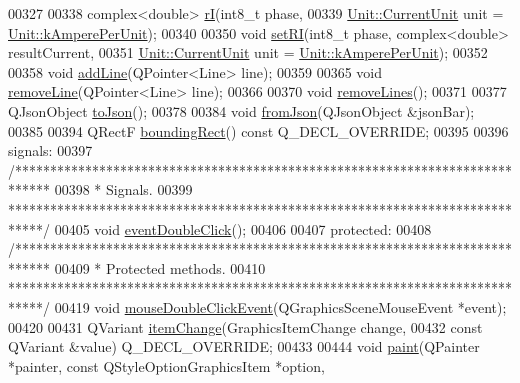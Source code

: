 \begin{DoxyCode}
00327 
00338   complex<double> \hyperlink{group___models_ga50eb46f3510205a9d6cb5e6547fa86df}{rI}(int8\_t phase,
00339                      \hyperlink{class_unit_a0794cf6c9682f48296dd4a5315389787}{Unit::CurrentUnit} unit = 
      \hyperlink{class_unit_a0794cf6c9682f48296dd4a5315389787aeed3b50e464d581cb630181a3b6a0709}{Unit::kAmperePerUnit});
00340 
00350   \textcolor{keywordtype}{void} \hyperlink{group___models_gaf7a406f8952b1e874c95c41b0955d250}{setRI}(int8\_t phase, complex<double> resultCurrent,
00351              \hyperlink{class_unit_a0794cf6c9682f48296dd4a5315389787}{Unit::CurrentUnit} unit = \hyperlink{class_unit_a0794cf6c9682f48296dd4a5315389787aeed3b50e464d581cb630181a3b6a0709}{Unit::kAmperePerUnit});
00352 
00358   \textcolor{keywordtype}{void} \hyperlink{group___models_gabb1a3b7653d4e2327c4bf728210f197e}{addLine}(QPointer<Line> line);
00359 
00365   \textcolor{keywordtype}{void} \hyperlink{group___models_gaec9faaf687415c27cd1d0527e1b94504}{removeLine}(QPointer<Line> line);
00366 
00370   \textcolor{keywordtype}{void} \hyperlink{group___models_ga4ea1a2074cb45968d80d6add571884a4}{removeLines}();
00371 
00377   QJsonObject \hyperlink{group___models_ga3eb84c42b687db6cd98e11b8bd38c86e}{toJson}();
00378 
00384   \textcolor{keywordtype}{void} \hyperlink{group___models_ga1df62f03dd3a066ceaf6588ba6bb6004}{fromJson}(QJsonObject &jsonBar);
00385 
00394   QRectF \hyperlink{group___models_ga8279d8109019cc7e139e2023690496be}{boundingRect}() const Q\_DECL\_OVERRIDE;
00395 
00396 signals:
00397   \textcolor{comment}{/*****************************************************************************}
00398 \textcolor{comment}{  * Signals.}
00399 \textcolor{comment}{  *****************************************************************************/}
00405   \textcolor{keywordtype}{void} \hyperlink{class_bar_a66bcbd19582dddee7e171ae5a4475f4b}{eventDoubleClick}();
00406 
00407 protected:
00408   \textcolor{comment}{/*****************************************************************************}
00409 \textcolor{comment}{  * Protected methods.}
00410 \textcolor{comment}{  *****************************************************************************/}
00419   \textcolor{keywordtype}{void} \hyperlink{group___models_ga1945e7b4401fa9ad7475274d9fb12a72}{mouseDoubleClickEvent}(QGraphicsSceneMouseEvent *event);
00420 
00431   QVariant \hyperlink{group___models_gad97a82d618ee0c51a9a36e44339c69e6}{itemChange}(GraphicsItemChange change,
00432                       const QVariant &value) Q\_DECL\_OVERRIDE;
00433 
00444   \textcolor{keywordtype}{void} \hyperlink{group___models_gacbb6dbac607412c9c1f9dfcd0cd4d432}{paint}(QPainter *painter, const QStyleOptionGraphicsItem *option,

\end{DoxyCode}
